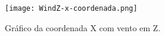 \begin{figure}[h!]
    \centering
    \texttt{[image: WindZ-x-coordenada.png]}
    \caption{Gráfico da coordenada X com vento em Z.}
    \label{fig:windz-x}
\end{figure}


\printindex
